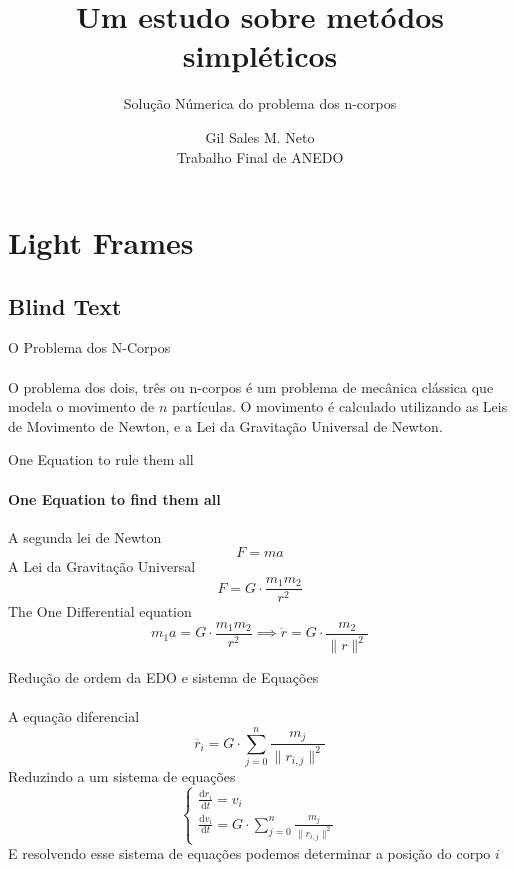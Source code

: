 \documentclass{beamer}
\title{Um estudo sobre metódos simpléticos} %
\subtitle{Solução Númerica do problema dos n-corpos} %
\author{Gil Sales M. Neto \\ {\tiny Trabalho Final de ANEDO}}
\begin{document}
  \frame{\maketitle}


    \section{Light Frames}
    \subsection{Blind Text}
    \begin{frame}{O Problema dos N-Corpos}
      \framesubtitle{}%
      O problema dos dois, três ou n-corpos é um problema de mecânica clássica que modela o movimento de \(n\) partículas. O movimento é calculado utilizando as Leis de Movimento de Newton, e a Lei da Gravitação Universal de Newton.
    \end{frame}

    \begin{frame}{One Equation to rule them all}
      \framesubtitle{One Equation to \alert{find} them all}%
      A segunda lei de Newton
      \[F = ma\]
      A Lei da Gravitação Universal
      \[F = G \cdot \frac{m_1 m_2}{r ^2}\]
      The One Differential equation
      \[
        m_1a = G \cdot \frac{m_1 m_2}{r ^2} \implies \ddot{r} = G \cdot \frac{m_2}{\lVert r \rVert ^2}
      \]
    \end{frame}

    \begin{frame}{Redução de ordem da EDO e sistema de Equações}
      \framesubtitle{}%
      A equação diferencial
      \[
        \ddot{r_i} = G \cdot \sum_{j = 0}^{n}\frac{m_j}{\lVert r_{i,j} \rVert ^2}
      \]
      Reduzindo a um sistema de equações
      \[
      \begin{cases}
        \frac{\mathrm{d}r_i}{\mathrm{d}t} = v_i \\
        \frac{\mathrm{d}v_i}{\mathrm{d}t} = G \cdot \displaystyle \sum_{j = 0}^{n}\frac{m_j}{\lVert r_{i,j} \rVert ^2}
      \end{cases}
      \]
      E resolvendo esse sistema de equações podemos determinar a posição do corpo \(i\)
    \end{frame}
\end{document}
